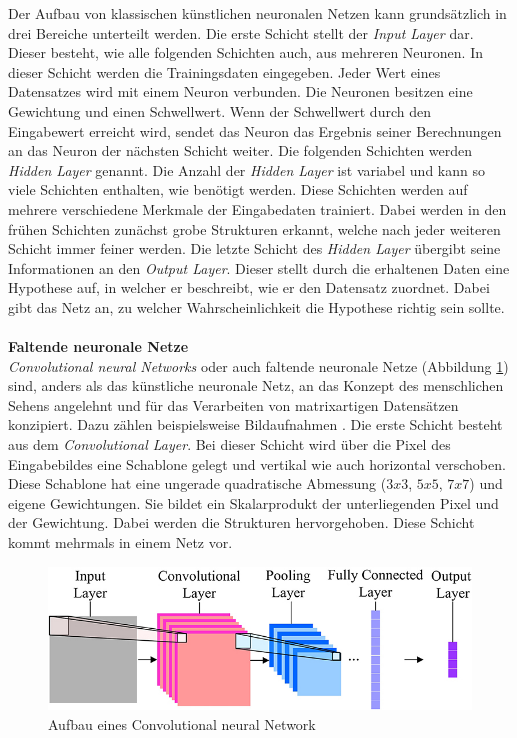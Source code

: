 Der Aufbau von klassischen künstlichen neuronalen Netzen kann grundsätzlich in drei Bereiche unterteilt werden. Die erste Schicht stellt der \textit{Input Layer} dar. Dieser besteht, wie alle folgenden Schichten auch, aus mehreren Neuronen. In dieser Schicht werden die Trainingsdaten eingegeben. Jeder Wert eines Datensatzes wird mit einem Neuron verbunden. Die Neuronen besitzen eine Gewichtung und einen Schwellwert. Wenn der Schwellwert durch den Eingabewert erreicht wird, sendet das Neuron das Ergebnis seiner Berechnungen an das Neuron der nächsten Schicht weiter. Die folgenden Schichten werden \textit{Hidden Layer} genannt. Die Anzahl der \textit{Hidden Layer} ist variabel und kann so viele Schichten enthalten, wie benötigt werden. Diese Schichten werden auf mehrere verschiedene Merkmale der Eingabedaten trainiert. Dabei werden in den frühen Schichten zunächst grobe Strukturen erkannt, welche nach jeder weiteren Schicht immer feiner werden. Die letzte Schicht des \textit{Hidden Layer} übergibt seine Informationen an den \textit{Output Layer}. Dieser stellt durch die erhaltenen Daten eine Hypothese auf, in welcher er beschreibt, wie er den Datensatz zuordnet. Dabei gibt das Netz an, zu welcher Wahrscheinlichkeit die Hypothese richtig sein sollte.\\\\
\textbf{Faltende neuronale Netze}\label{s.cnn}\\
\textit{Convolutional neural Networks} oder auch faltende neuronale Netze (Abbildung \ref{img:cnn}) sind, anders als das künstliche neuronale Netz, an das Konzept des menschlichen Sehens angelehnt \cite{sermanet2012convolutional} und für das Verarbeiten von matrixartigen Datensätzen konzipiert. Dazu zählen beispielsweise Bildaufnahmen \cite{goodfellow2016deep}. Die erste Schicht besteht aus dem \textit{Convolutional Layer}. Bei dieser Schicht wird über die Pixel des Eingabebildes eine Schablone gelegt und vertikal wie auch horizontal verschoben. Diese Schablone hat eine ungerade quadratische Abmessung ($3x3$, $5x5$, $7x7$) und eigene Gewichtungen. Sie bildet ein Skalarprodukt der unterliegenden Pixel und der Gewichtung. Dabei werden die Strukturen hervorgehoben. Diese Schicht kommt mehrmals in einem Netz vor.\\  
\begin{figure}
	[h]
	\centering
	\includegraphics[scale=0.5]{Sources/cnnet.jpg}
	\caption{Aufbau eines Convolutional neural Network \cite{info7040061}}
	\label{img:cnn}
\end{figure}\\
